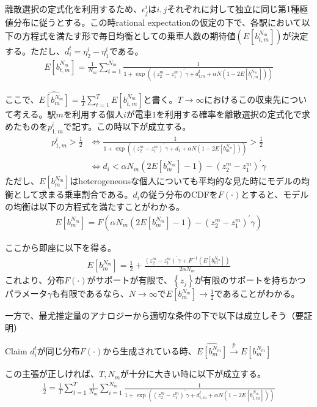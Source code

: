 \documentclass{jsarticle}
\begin{document}
離散選択の定式化を利用するため、$\epsilon_j^i$は$i, j$それぞれに対して独立に同じ第1種極値分布に従うとする。この時rational expectationの仮定の下で、各駅において以下の方程式を満たす形で毎日均衡としての乗車人数の期待値$(E[b_{t,m}^{N_m}])$が決定する。ただし、$d_i^t = \eta_2^i - \eta_1^i$である。
\begin{align*}
	E[b_{t,m}^{N_m}] = \frac{1}{N_m} \sum_{i = 1}^{N_m} \frac{1}{1 + \exp\left( (z_2^m - z_1^m)^{'}\gamma + d_{i.m}^t + \alpha N \left(1 - 2E[b_{t,m}^{N_m}]\right) \right)}
\end{align*}

ここで、$\widehat{E[b_m^{N_m}]} = \frac{1}{T} \sum_{t = 1}^T E[b_{t,m}^{N_m}]$と書く。$T \to \infty$におけるこの収束先について考える。駅$m$を利用する個人$i$が電車$1$を利用する確率を離散選択の定式化で求めたものを$p_{1,m}^i$で記す。この時以下が成立する。
\begin{align*}
	p_{1,m}^i > \frac{1}{2} &\Leftrightarrow \frac{1}{1 + \exp\left( (z_2^m - z_1^m)^{'}\gamma + d_i + \alpha N \left(1 - 2E[b_m^{N_m}]\right) \right)} > \frac{1}{2}\\[8pt]
	&\Leftrightarrow d_i < \alpha N_m \left(2E[b_m^{N_m}] - 1\right) - (z_2^m - z_1^m)^{'}\gamma
\end{align*}
ただし、$E[b_m^{N_m}]$はheterogeneousな個人についても平均的な見た時にモデルの均衡として求まる乗車割合である。$d_i$の従う分布のCDFを$F(\cdot)$とすると、モデルの均衡は以下の方程式を満たすことがわかる。
\begin{align*}
	E[b_m^{N_m}] = F\left( \alpha N_m \left(2E[b_m^{N_m}] - 1\right) - (z_2^m - z_1^m)^{'}\gamma \right)
\end{align*}

ここから即座に以下を得る。
\begin{align*}
	E[b_m^{N_m}] = \frac{1}{2} + \frac{(z_2^m - z_1^m)^{'}\gamma + F^{-1} \left( E[b_m^{N_m}] \right)}{2\alpha N_m}
\end{align*}
これより、分布$F(\cdot)$がサポートが有限で、$\left\{ z_j \right\}$が有限のサポートを持ちかつパラメータ$\gamma$も有限であるなら、$N \to \infty$で$E[b_m^{N_m}] \to \frac{1}{2}$であることがわかる。

一方で、最尤推定量のアナロジーから適切な条件の下で以下は成立しそう（要証明）
\begin{itembox}[l]{Claim}
	$d_i^t$が同じ分布$F(\cdot)$から生成されている時、$\widehat{E[b_m^{N_m}]} \xrightarrow[]{p} E[b_m^{N_m}]$
\end{itembox}
この主張が正しければ、$T,N_m$が十分に大きい時に以下が成立する。
\begin{align*}
	\frac{1}{2} = \frac{1}{T}\sum_{t = 1}^T \frac{1}{N_m}\sum_{i = 1}^{N_m} \frac{1}{1 + \exp\left( (z_2^m - z_1^m)^{'}\gamma + d_{i,m}^t + \alpha N \left(1 - 2E[b_{t,m}^{N_m}]\right) \right)}
\end{align*}
\end{document}
